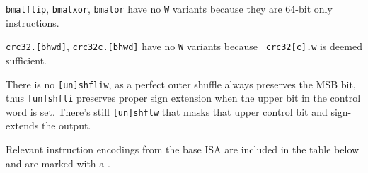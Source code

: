{\tt bmatflip}, {\tt bmatxor}, {\tt bmator} have no {\tt *W} variants because
they are 64-bit only instructions.

{\tt crc32.[bhwd]}, {\tt crc32c.[bhwd]} have no {\tt *W} variants because {\tt
crc32[c].w} is deemed sufficient.

There is no {\tt [un]shfliw}, as a perfect outer shuffle always preserves the
MSB bit, thus {\tt [un]shfli} preserves proper sign extension when the
upper bit in the control word is set. There's still {\tt [un]shflw} that
masks that upper control bit and sign-extends the output.

Relevant instruction encodings from the base ISA are included in the table below
and are marked with a {\tt *}.



